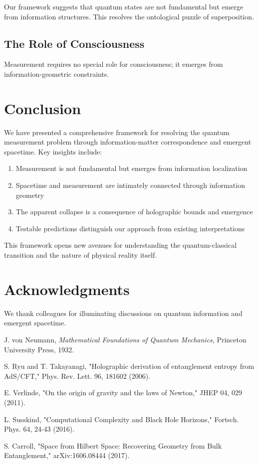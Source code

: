 \documentclass[12pt,a4paper]{article}
\theoremstyle{definition}
\begin{document}
Our framework suggests that quantum states are not fundamental but emerge from information structures. This resolves the ontological puzzle of superposition.

\subsection{The Role of Consciousness}

Measurement requires no special role for consciousness; it emerges from information-geometric constraints.

\section{Conclusion}

We have presented a comprehensive framework for resolving the quantum measurement problem through information-matter correspondence and emergent spacetime. Key insights include:

\begin{enumerate}
    \item Measurement is not fundamental but emerges from information localization
    \item Spacetime and measurement are intimately connected through information geometry
    \item The apparent collapse is a consequence of holographic bounds and emergence
    \item Testable predictions distinguish our approach from existing interpretations
\end{enumerate}

This framework opens new avenues for understanding the quantum-classical transition and the nature of physical reality itself.

\section{Acknowledgments}

We thank colleagues for illuminating discussions on quantum information and emergent spacetime.

\begin{thebibliography}{99}

J. von Neumann, \textit{Mathematical Foundations of Quantum Mechanics}, Princeton University Press, 1932.

S. Ryu and T. Takayanagi, "Holographic derivation of entanglement entropy from AdS/CFT," Phys. Rev. Lett. 96, 181602 (2006).

E. Verlinde, "On the origin of gravity and the laws of Newton," JHEP 04, 029 (2011).

L. Susskind, "Computational Complexity and Black Hole Horizons," Fortsch. Phys. 64, 24-43 (2016).

S. Carroll, "Space from Hilbert Space: Recovering Geometry from Bulk Entanglement," arXiv:1606.08444 (2017).

\end{thebibliography}
\end{document}
